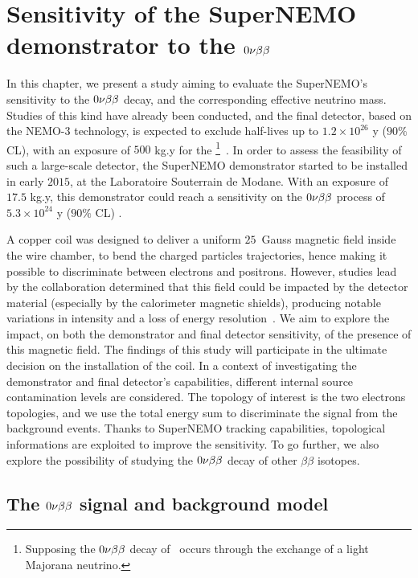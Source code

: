 \chapter{Sensitivity of the SuperNEMO demonstrator to the $0\nu\beta\beta$}
\label{ch:sensitivity}

In this chapter, we present a study aiming to evaluate the SuperNEMO's sensitivity to the $0\nu\beta\beta$ decay, and the corresponding effective neutrino mass.
Studies of this kind have already been conducted, and the final detector, based on the NEMO-$3$ technology, is expected to exclude half-lives up to $1.2\times 10^{26}$ y ($90\%$ CL), with an exposure of $500$ kg.y for the \Se\footnote{Supposing the $0\nu\beta\beta$ decay of \Se\ occurs through the exchange of a light Majorana neutrino.}~\cite{art:SuperNEMO2010}.
In order to assess the feasibility of such a large-scale detector, the SuperNEMO demonstrator started to be installed in early $2015$, at the Laboratoire Souterrain de Modane.
With an exposure of $17.5$ kg.y, this demonstrator could reach a sensitivity on the $0\nu\beta\beta$ process of \Se\ $5.3\times 10^{24}$ y ($90\%$ CL) \cite{CalvezThesis}.

A copper coil was designed to deliver a uniform $25$~Gauss magnetic field inside the wire chamber, to bend the charged particles trajectories, hence making it possible to discriminate between electrons and positrons.
However, studies lead by the collaboration determined that this field could be impacted by the detector material (especially by the calorimeter magnetic shields), producing notable variations in intensity and a loss of energy resolution~\cite{CalvezThesis}\cite{internal:magnetic_field}.
We aim to explore the impact, on both the demonstrator and final detector sensitivity, of the presence of this magnetic field.
The findings of this study will participate in the ultimate decision on the installation of the coil.
In a context of investigating the demonstrator and final detector's capabilities, different internal source contamination levels are considered.
The topology of interest is the two electrons topologies, and we use the total energy sum to discriminate the signal from the background events.
Thanks to SuperNEMO tracking capabilities, topological informations are exploited to improve the sensitivity.
To go further, we also explore the possibility of studying the $0\nu\beta\beta$ decay of other $\beta\beta$ isotopes.

\section{The $0\nu\beta\beta$ signal and background model}
\label{sec:sensitivity_simus}

